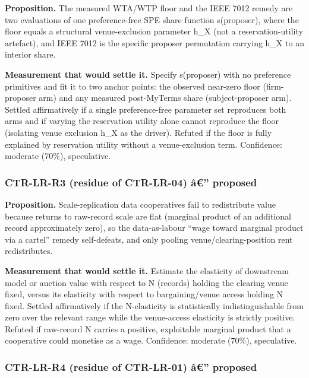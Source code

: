 \documentclass[
  11pt,
]{article}
\begin{document}
\textbf{Proposition.} The measured WTA/WTP floor and the IEEE 7012
remedy are two evaluations of one preference-free SPE share function
s(proposer), where the floor equals a structural venue-exclusion
parameter h\_X (not a reservation-utility artefact), and IEEE 7012 is
the specific proposer permutation carrying h\_X to an interior share.

\textbf{Measurement that would settle it.} Specify s(proposer) with no
preference primitives and fit it to two anchor points: the observed
near-zero floor (firm-proposer arm) and any measured post-MyTerms share
(subject-proposer arm). Settled affirmatively if a single
preference-free parameter set reproduces both arms and if varying the
reservation utility alone cannot reproduce the floor (isolating venue
exclusion h\_X as the driver). Refuted if the floor is fully explained
by reservation utility without a venue-exclusion term. Confidence:
moderate (70\%), speculative.

\subsubsection{CTR-LR-R3 (residue of CTR-LR-04) â€''
proposed}\label{ctr-lr-r3-residue-of-ctr-lr-04-uxe2-proposed}

\textbf{Proposition.} Scale-replication data cooperatives fail to
redistribute value because returns to raw-record scale are flat
(marginal product of an additional record approximately zero), so the
data-as-labour ``wage toward marginal product via a cartel'' remedy
self-defeats, and only pooling venue/clearing-position rent
redistributes.

\textbf{Measurement that would settle it.} Estimate the elasticity of
downstream model or auction value with respect to N (records) holding
the clearing venue fixed, versus its elasticity with respect to
bargaining/venue access holding N fixed. Settled affirmatively if the
N-elasticity is statistically indistinguishable from zero over the
relevant range while the venue-access elasticity is strictly positive.
Refuted if raw-record N carries a positive, exploitable marginal product
that a cooperative could monetise as a wage. Confidence: moderate
(70\%), speculative.

\subsubsection{CTR-LR-R4 (residue of CTR-LR-01) â€''
proposed}\label{ctr-lr-r4-residue-of-ctr-lr-01-uxe2-proposed}
\end{document}
